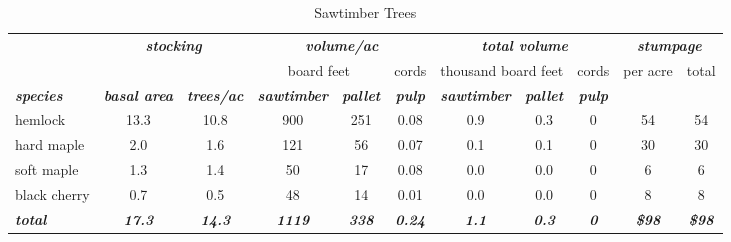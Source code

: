 \documentclass[landscape]{article}
\begin{document}
\begin{table}[H]

\caption{\label{tab:unnamed-chunk-33}Sawtimber Trees}
\fontsize{10}{12}\selectfont
\begin{tabular}[t]{lcccccccccc}
\toprule
\multicolumn{1}{c}{\em{\textbf{ }}} & \multicolumn{2}{c}{\em{\textbf{stocking}}} & \multicolumn{3}{c}{\em{\textbf{volume/ac }}} & \multicolumn{3}{c}{\em{\textbf{total volume}}} & \multicolumn{2}{c}{\em{\textbf{stumpage}}} \\
\cmidrule(l{3pt}r{3pt}){2-3} \cmidrule(l{3pt}r{3pt}){4-6} \cmidrule(l{3pt}r{3pt}){7-9} \cmidrule(l{3pt}r{3pt}){10-11}
\multicolumn{3}{c}{ } & \multicolumn{2}{c}{board feet} & \multicolumn{1}{c}{cords} & \multicolumn{2}{c}{thousand board feet} & \multicolumn{1}{c}{cords} & \multicolumn{1}{c}{per acre} & \multicolumn{1}{c}{total} \\
\cmidrule(l{3pt}r{3pt}){4-5} \cmidrule(l{3pt}r{3pt}){6-6} \cmidrule(l{3pt}r{3pt}){7-8} \cmidrule(l{3pt}r{3pt}){9-9} \cmidrule(l{3pt}r{3pt}){10-10} \cmidrule(l{3pt}r{3pt}){11-11}
\rowcolor[HTML]{DCDCDC}  \em{\textbf{species}} & \em{\textbf{basal area}} & \em{\textbf{trees/ac}} & \em{\textbf{sawtimber}} & \em{\textbf{pallet}} & \em{\textbf{pulp}} & \em{\textbf{sawtimber}} & \em{\textbf{pallet}} & \em{\textbf{pulp}} & \em{\textbf{ }} & \em{\textbf{ }}\\
\midrule
\rowcolor{gray!6}  hemlock & 13.3 & 10.8 & 900 & 251 & 0.08 & 0.9 & 0.3 & 0 & 54 & 54\\
 
hard maple & 2.0 & 1.6 & 121 & 56 & 0.07 & 0.1 & 0.1 & 0 & 30 & 30\\
 
\rowcolor{gray!6}  soft maple & 1.3 & 1.4 & 50 & 17 & 0.08 & 0.0 & 0.0 & 0 & 6 & 6\\
 
black cherry & 0.7 & 0.5 & 48 & 14 & 0.01 & 0.0 & 0.0 & 0 & 8 & 8\\
 
\rowcolor{gray!6}  \rowcolor[HTML]{DCDCDC}  \em{\textbf{total}} & \em{\textbf{17.3}} & \em{\textbf{14.3}} & \em{\textbf{1119}} & \em{\textbf{338}} & \em{\textbf{0.24}} & \em{\textbf{1.1}} & \em{\textbf{0.3}} & \em{\textbf{0}} & \em{\textbf{\$98}} & \em{\textbf{\$98}}\\
\bottomrule
\end{tabular}
\end{table}
\end{document}
